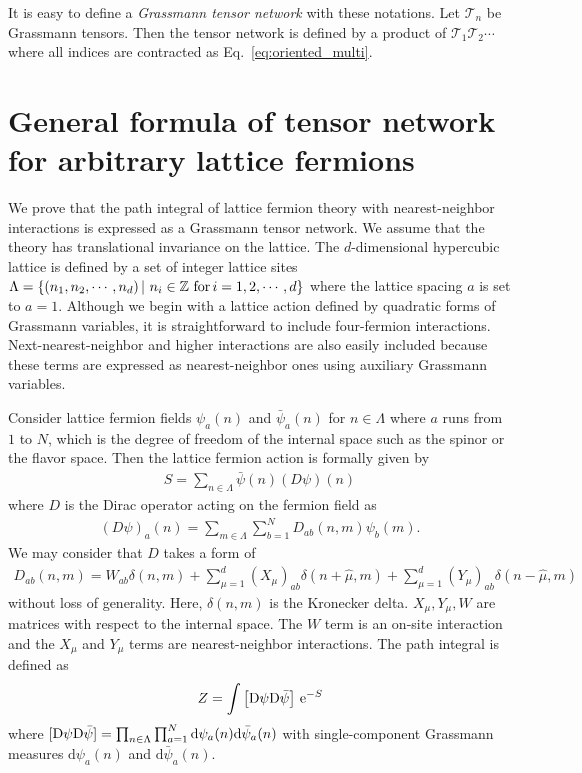 \documentclass[a4paper,11pt]{article}
\newcommand{\diff}{\mathrm{d}}
\newcommand{\e}{\mathrm{e}}
\begin{document}
It is easy to define a {\it Grassmann tensor network} with these notations. Let $\mathcal{T}_n$ be Grassmann tensors. Then the tensor network is defined by a product of $\mathcal{T}_1\mathcal{T}_2\cdots$ where all indices are contracted as  Eq.~\eqref{eq:oriented_multi}.
%

\section{General formula of tensor network for arbitrary lattice fermions}
\label{sec:TN}

We prove that the path integral of lattice fermion theory with nearest-neighbor interactions is expressed as a Grassmann tensor network.  We assume that the theory has translational invariance on the lattice.
%
The $d$-dimensional hypercubic lattice is defined by a set of integer lattice sites $\Lambda  =\{(n_1,n_2,\cdots,n_d) \, | \ n_i \in \mathbb{Z} \ {\rm for} \, i=1,2,\cdots,d \}$ where the lattice spacing $a$ is set to $a=1$. 
Although we begin with a lattice action defined by quadratic forms of Grassmann variables, 
it is straightforward to include four-fermion interactions. 
Next-nearest-neighbor and higher interactions are also easily included because these terms are expressed as nearest-neighbor ones using auxiliary Grassmann variables. 

Consider lattice  fermion fields $\psi_a(n)$ and $\bar\psi_{a}(n)$ for $n \in \Lambda$ where  $a$ runs from $1$ to $N$, which is the degree of freedom of the internal space such as the spinor or the flavor space. Then the lattice fermion action is formally given by
\begin{align}
	S= \sum_{n\in \Lambda} \bar\psi(n) (D \psi)(n)
\end{align}
where $D$ is the Dirac operator acting on the fermion field as
\begin{align}
	(D \psi)_a(n) = \sum_{m \in \Lambda} \sum_{b=1}^N D_{ab}(n,m) \psi_b(m). 
\end{align}
We may consider that $D$ takes a form of 
\begin{align}
	D_{ab}(n,m) = W_{ab} \delta(n,m) + \sum_{\mu=1}^d (X_\mu)_{ab} \delta(n+\hat \mu,m) 
	+ \sum_{\mu=1}^d  (Y_\mu)_{ab} \delta(n-\hat \mu,m)
	\label{gerenal_form}
\end{align}
without loss of generality. Here, 
$\delta(n,m)$ is the Kronecker delta. 
$X_\mu,Y_\mu,W$ are matrices with respect to the internal space. 
The $W$ term is an on-site interaction and the $X_\mu$ and $Y_\mu$ terms are nearest-neighbor interactions. The path integral is defined as
\begin{align}
Z= \int \left[{\rm D}\psi {\rm D}\bar\psi\right] \, \e^{-S} 
\label{Z_general}
\end{align}
where 
$[{\rm D}\psi {\rm D}\bar\psi] = \prod_{n \in \Lambda}  \prod_{a=1}^N \diff\psi_a(n) \diff \bar\psi_a(n)$ 
with single-component Grassmann measures  $\diff \psi_a(n)$ and $\diff \bar\psi_a(n)$. 
\end{document}
